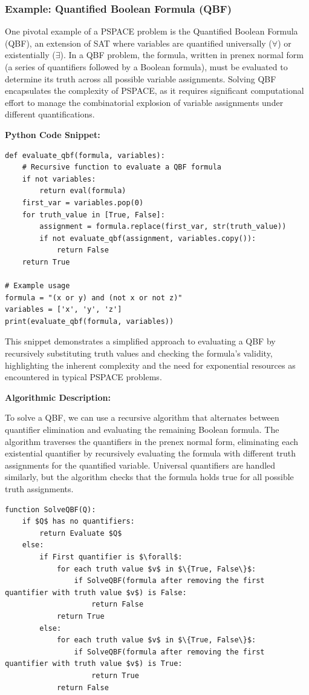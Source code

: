 \subsubsection{Example: Quantified Boolean Formula (QBF)}
One pivotal example of a PSPACE problem is the Quantified Boolean Formula (QBF), an extension of SAT where variables are quantified universally (\(\forall\)) or existentially (\(\exists\)). In a QBF problem, the formula, written in prenex normal form (a series of quantifiers followed by a Boolean formula), must be evaluated to determine its truth across all possible variable assignments. Solving QBF encapsulates the complexity of PSPACE, as it requires significant computational effort to manage the combinatorial explosion of variable assignments under different quantifications.

\textbf{Python Code Snippet:}
\begin{verbatim}
def evaluate_qbf(formula, variables):
    # Recursive function to evaluate a QBF formula
    if not variables:
        return eval(formula)
    first_var = variables.pop(0)
    for truth_value in [True, False]:
        assignment = formula.replace(first_var, str(truth_value))
        if not evaluate_qbf(assignment, variables.copy()):
            return False
    return True

# Example usage
formula = "(x or y) and (not x or not z)"
variables = ['x', 'y', 'z']
print(evaluate_qbf(formula, variables))
\end{verbatim}

This snippet demonstrates a simplified approach to evaluating a QBF by recursively substituting truth values and checking the formula's validity, highlighting the inherent complexity and the need for exponential resources as encountered in typical PSPACE problems.

\textbf{Algorithmic Description:}

To solve a QBF, we can use a recursive algorithm that alternates between quantifier elimination and evaluating the remaining Boolean formula. The algorithm traverses the quantifiers in the prenex normal form, eliminating each existential quantifier by recursively evaluating the formula with different truth assignments for the quantified variable. Universal quantifiers are handled similarly, but the algorithm checks that the formula holds true for all possible truth assignments.

\begin{lstlisting}[caption={SolveQBF algorithm},label={lst:solve_qbf}]
function SolveQBF(Q):
    if $Q$ has no quantifiers:
        return Evaluate $Q$
    else:
        if First quantifier is $\forall$:
            for each truth value $v$ in $\{True, False\}$:
                if SolveQBF(formula after removing the first quantifier with truth value $v$) is False:
                    return False
            return True
        else:
            for each truth value $v$ in $\{True, False\}$:
                if SolveQBF(formula after removing the first quantifier with truth value $v$) is True:
                    return True
            return False
\end{lstlisting}

